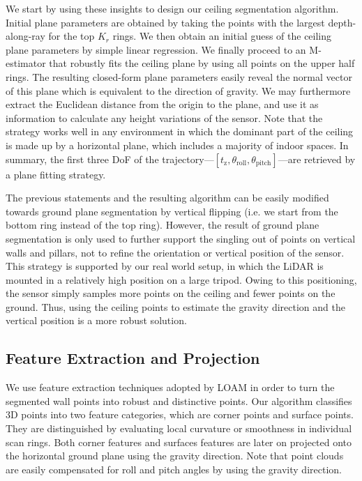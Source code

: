 \documentclass[letterpaper, 10 pt, conference]{ieeeconf}  %
\begin{document}
We start by using these insights to design our ceiling segmentation algorithm. Initial plane parameters are obtained by taking the points with the largest depth-along-ray for the top $K_r$ rings. We then obtain an initial guess of the ceiling plane parameters by simple linear regression. We finally proceed to an M-estimator that robustly fits the ceiling plane by using all points on the upper half rings. The resulting closed-form plane parameters easily reveal the normal vector of this plane which is equivalent to the direction of gravity. We may furthermore extract the Euclidean distance from the origin to the plane, and use it as information to calculate any height variations of the sensor. Note that the strategy works well in any environment in which the dominant part of the ceiling is made up by a horizontal plane, which includes a majority of indoor spaces. In summary, the first three DoF of the trajectory---$[t_\text{z}, \theta_{\text{roll}}, \theta_{\text{pitch}}]$---are retrieved by a plane fitting strategy.

The previous statements and the resulting algorithm can be easily modified towards ground plane segmentation by vertical flipping (i.e. we start from the bottom ring instead of the top ring). However, the result of ground plane segmentation is only used to further support the singling out of points on vertical walls and pillars, not to refine the orientation or vertical position of the sensor. This strategy is supported by our real world setup, in which the LiDAR is mounted in a relatively high position on a large tripod. Owing to this positioning, the sensor simply samples more points on the ceiling and fewer points on the ground. Thus, using the ceiling points to estimate the gravity direction and the vertical position is a more robust solution.

\subsection{Feature Extraction and Projection}
\label{Feature Extraction and Projection}

We use feature extraction techniques adopted by LOAM \cite{zhang2014loam} in order to turn the segmented wall points into robust and distinctive points. Our algorithm classifies 3D points into two feature categories, which are corner points and surface points. They are distinguished by evaluating local curvature or smoothness in individual scan rings. Both corner features and surfaces features are later on projected onto the horizontal ground plane using the gravity direction. Note that point clouds are easily compensated for roll and pitch angles by using the gravity direction.
\end{document}
